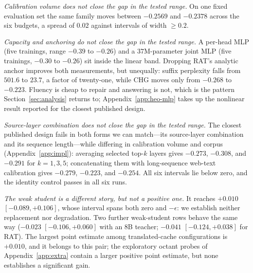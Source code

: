 \documentclass{article} %
\begin{document}
\emph{Calibration volume does not close the gap in the tested range.} On one fixed evaluation set the same
family moves between $-0.2569$ and $-0.2378$ across the six budgets, a spread
of $0.02$ against intervals of width $\ge 0.2$.

\emph{Capacity and anchoring do not close the gap in the tested range.} A per-head MLP (five
trainings, range $-0.39$ to $-0.26$) and a $37$M-parameter joint MLP (five
trainings, $-0.30$ to $-0.26$) sit inside the linear band. Dropping RAT's
analytic anchor improves both measurements, but unequally: suffix perplexity
falls from $501.6$ to $23.7$, a factor of twenty-one, while CHG moves only from
$-0.268$ to $-0.223$. Fluency is cheap to repair and answering is not, which is
the pattern Section~\ref{sec:analysis} returns to; Appendix~\ref{app:heo-mlp}
takes up the nonlinear result reported for the closest published design.

\emph{Source-layer combination does not close the gap in the tested range.} The closest published design
fails in both forms we can match---its source-layer combination and its
sequence length---while differing in calibration volume and corpus
(Appendix~\ref{app:impl}): averaging selected top-$k$ layers gives $-0.273$,
$-0.308$, and $-0.291$ for $k{=}1,3,5$; concatenating them with long-sequence
web-text calibration gives $-0.279$, $-0.223$, and $-0.254$. All six intervals
lie below zero, and the identity control passes in all six runs.

\emph{The weak student is a different story, but not a positive one.} It reaches
$+0.010$ $[-0.089,+0.106]$, whose interval spans both zero and $-\epsilon$: we
establish neither replacement nor degradation. Two further weak-student rows
behave the same way ($-0.023$ $[-0.106,+0.060]$ with an $8$B teacher; $-0.041$
$[-0.124,+0.038]$ for RAT). The largest point estimate among translated-cache
configurations is $+0.010$, and it belongs to this pair; the exploratory octant
probes of Appendix~\ref{app:extra} contain a larger positive point estimate, but
none establishes a significant gain.
\end{document}
